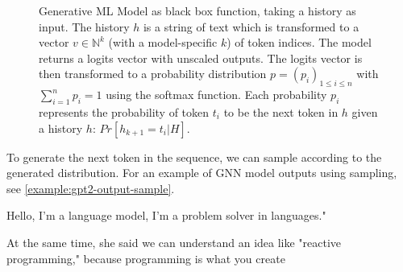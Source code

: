 \begin{figure}[htpb]
	\centering
	\caption{
Generative ML Model as black box function, taking a history as input.
The history $h$ is a string of text which is transformed to a vector $v \in \mathbb{N}^k$ (with a model-specific $k$) of token indices.
The model returns a logits vector with unscaled outputs.
The logits vector is then transformed to a probability distribution $p = \left(p_i\right)_{1 \leq i \leq n}$ with $\sum_{i=1}^n p_i = 1$ using the softmax function.
Each probability $p_i$ represents the probability of token $t_i$ to be the next token in $h$ given a history $h$: $Pr[h_{k+1}=t_i|H]$.
}
	\label{fig:generative-network}
\end{figure}
To generate the next token in the sequence, we can sample according to the generated distribution.
For an example of GNN model outputs using sampling, see \ref{example:gpt2-output-sample}.

\begin{example}
	Hello, I'm a language model, I'm a problem solver in languages."

	At the same time, she said we can understand an idea like "reactive programming," because programming is what you create
	\label{example:gpt2-output-sample}
\end{example}

